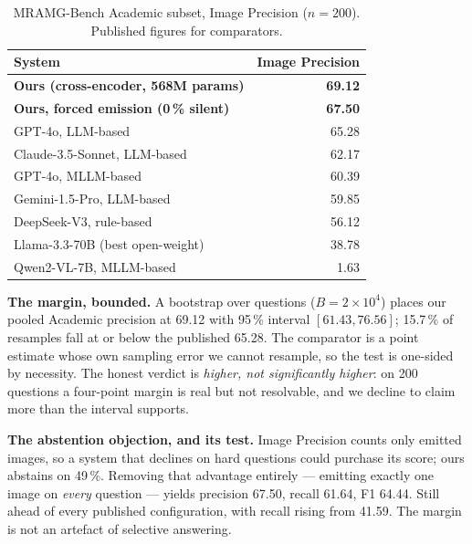 \documentclass[journal]{IEEEtran}
\begin{document}
\begin{table}[t]
\caption{MRAMG-Bench Academic subset, Image Precision ($n = 200$). Published
figures for comparators.}
\label{tab:mramg}
\centering
\begin{tabular}{@{}lr@{}}
\toprule
System & Image Precision \\
\midrule
\textbf{Ours (cross-encoder, 568M params)} & \textbf{69.12} \\
\textbf{Ours, forced emission (0\,\% silent)} & \textbf{67.50} \\
GPT-4o, LLM-based & 65.28 \\
Claude-3.5-Sonnet, LLM-based & 62.17 \\
GPT-4o, MLLM-based & 60.39 \\
Gemini-1.5-Pro, LLM-based & 59.85 \\
DeepSeek-V3, rule-based & 56.12 \\
Llama-3.3-70B (best open-weight) & 38.78 \\
Qwen2-VL-7B, MLLM-based & 1.63 \\
\bottomrule
\end{tabular}
\end{table}

\textbf{The margin, bounded.} A bootstrap over questions ($B = 2 \times 10^4$)
places our pooled Academic precision at 69.12 with 95\,\% interval
$[61.43, 76.56]$; 15.7\,\% of resamples fall at or below the published 65.28.
The comparator is a point estimate whose own sampling error we cannot
resample, so the test is one-sided by necessity. The honest verdict is
\emph{higher, not significantly higher}: on 200 questions a four-point margin
is real but not resolvable, and we decline to claim more than the interval
supports.

\textbf{The abstention objection, and its test.} Image Precision counts only
emitted images, so a system that declines on hard questions could purchase its
score; ours abstains on 49\,\%. Removing that advantage entirely --- emitting
exactly one image on \emph{every} question --- yields precision 67.50, recall
61.64, F1 64.44. Still ahead of every published configuration, with recall rising
from 41.59. The margin is not an artefact of selective answering.
\end{document}

